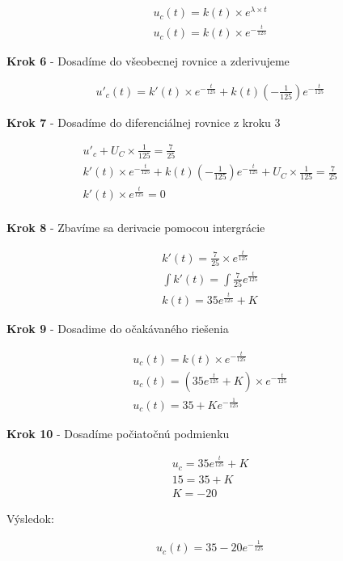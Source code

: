\begin{gather*}
    u_{c}(t) = k(t) \times e^{\lambda \times t} \\
    u_{c}(t) = k(t) \times e^{-\frac {t}{125}}
\end{gather*}

\begin{center}
    \textbf{Krok 6} - Dosadíme do všeobecnej rovnice a zderivujeme
\end{center}

\begin{gather*}
    u'_{c}(t) = k'(t) \times e^{-\frac {t}{125}} + k(t)(-\frac {1} {125})e^{-\frac {t}{125}}
\end{gather*}

\begin{center}
    \textbf{Krok 7} - Dosadíme do diferenciálnej rovnice z kroku 3
\end{center}

\begin{gather*}
    u'_{c} + U_{C} \times \frac {1} {125} = \frac {7} {25} \\
   k'(t) \times e^{-\frac {t}{125}} + k(t)(-\frac {1} {125})e^{-\frac {t}{125}} + U_{C} \times \frac {1} {125} = \frac {7} {25} \\
    k'(t) \times e^{\frac {t}{125}} = 0 \\
\end{gather*}

\begin{center}
    \textbf{Krok 8} - Zbavíme sa derivacie pomocou intergrácie
\end{center}

\begin{gather*}
    k'(t) = \frac {7} {25} \times e^{\frac {t}{125}} \\
    \int k'(t) = \int \frac {7} {25} e^{\frac {t}{125}} \\
    k(t) = 35e^{\frac{t}{125}} + K
\end{gather*}

\newpage

\begin{center}
    \textbf{Krok 9} - Dosadime do očakávaného riešenia
\end{center}

\begin{gather*}
   u_{c}(t) = k(t) \times e^{-\frac {t}{125}} \\ 
   u_{c}(t) = (35e^{\frac{t}{125}} + K) \times e^{-\frac {t}{125}} \\ 
    u_{c}(t) = 35 + Ke^{-\frac{1}{125}}
\end{gather*}

\begin{center}
    \textbf{Krok 10} - Dosadíme počiatočnú podmienku
\end{center}

\begin{gather*}
   u_{c} = 35e^{\frac{t}{125}} + K \\
   15 = 35 + K \\
    K = - 20
\end{gather*}


Výsledok:

\begin{gather*}
	u_{c}(t) = 35-20e^{-\frac{1}{125}}
\end{gather*}

